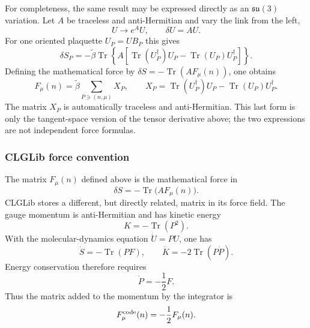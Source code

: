 For completeness, the same result may be expressed directly as an
$\mathfrak{su}(3)$ variation.  Let $A$ be traceless and anti-Hermitian and
vary the link from the left,
\begin{equation}
U\longrightarrow e^A U,
\qquad \delta U=AU.
\end{equation}
For one oriented plaquette $U_P=UB_P$ this gives
\begin{equation}
\delta S_P=-\widetilde\beta\operatorname{Tr}\left\{
A\left[
\operatorname{Tr}(U_P^\dagger)U_P
-\operatorname{Tr}(U_P)U_P^\dagger
\right]\right\}.
\end{equation}
Defining the mathematical force by
$\delta S=-\operatorname{Tr}(AF_\mu(n))$, one obtains
\begin{equation}
\boxed{
F_\mu(n)=\widetilde\beta\sum_{P\ni(n,\mu)}X_P,
\qquad
X_P=\operatorname{Tr}(U_P^\dagger)U_P
-\operatorname{Tr}(U_P)U_P^\dagger .
}
\end{equation}
The matrix $X_P$ is automatically traceless and anti-Hermitian.  This last
form is only the tangent-space version of the tensor derivative above; the
two expressions are not independent force formulas.

\subsubsection{CLGLib force convention}

The matrix $F_\mu(n)$ defined above is the mathematical force in
\begin{equation}
\delta S=-\operatorname{Tr}\bigl(A F_\mu(n)\bigr).
\end{equation}
CLGLib stores a different, but directly related, matrix in its force field.
The gauge momentum is anti-Hermitian and has kinetic energy
\begin{equation}
K=-\operatorname{Tr}(P^2).
\end{equation}
With the molecular-dynamics equation $\dot U=PU$, one has
\begin{equation}
\dot S=-\operatorname{Tr}(P F),
\qquad
\dot K=-2\operatorname{Tr}(P\dot P).
\end{equation}
Energy conservation therefore requires
\begin{equation}
\boxed{
\dot P=-\frac{1}{2}F.
}
\end{equation}
Thus the matrix added to the momentum by the integrator is
\begin{equation}
F^{\rm code}_\mu(n)=-\frac{1}{2}F_\mu(n).
\end{equation}

